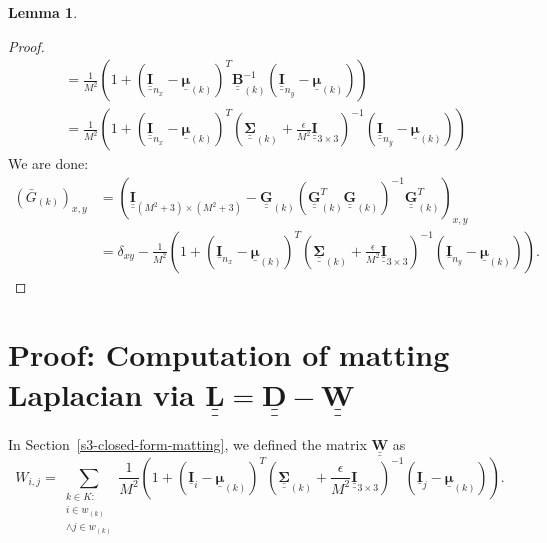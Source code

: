 \documentclass{article}
\theoremstyle{definition}
\newtheorem{lemma}[theorem]{Lemma}
\def\vt#1{\underline{\mathbf{#1}}}
\def\vts#1{\underline{\boldsymbol{#1}}}
\def\mt#1{\underline{\underline{\mathbf{#1}}}}
\def\mts#1{\underline{\underline{\boldsymbol{#1}}}}
\begin{document}
\begin{lemma}
\begin{proof}
\begin{align*}
            &= \frac1{M^2} \left(1 + \left(\mt I_{n_x} - \vts \mu_{(k)}\right)^T \mt B_{(k)}^{-1} \left(\mt I_{n_y} - \vts \mu_{(k)}\right)\right)\\
            &= \frac1{M^2} \left(1 + \left(\mt I_{n_x} - \vts \mu_{(k)}\right)^T \left(\mts \Sigma_{(k)}+\frac\epsilon{M^2}\mt I_{3\times 3}\right)^{-1} \left(\mt I_{n_y} - \vts \mu_{(k)}\right)\right)
        \end{align*}
        We are done:
        \begin{align*}
            \left({\bar{G}}_{(k)}\right)_{x,y} &= \left(\mt I_{(M^2+3)\times(M^2+3)} - \mt G_{(k)} \left(\mt G_{(k)}^T \mt G_{(k)}\right)^{-1} \mt G_{(k)}^T\right)_{x,y} \\
            &= \delta_{xy} - \frac1{M^2}\left(1 + \left(\vt{I}_{n_x} - \vts \mu_{(k)}\right)^T \left(\mts \Sigma_{(k)} + \frac\epsilon{M^2} \mt{I}_{3\times 3}\right)^{-1} \left(\vt{I}_{n_y} - \vts \mu_{(k)}\right) \right).
        \end{align*}
    \end{proof}
\end{lemma}



\newpage
\section{Proof: Computation of matting Laplacian via $\mt L = \mt D - \mt W$} \label{appendix:w-sum-zero-proof}
In Section~\ref{s3-closed-form-matting}, we defined the matrix $\mt W$ as
$$ W_{i,j} = \sum_{\substack{k\in K:\\i\in w_{(k)}\\\wedge j\in w_{(k)}}} \frac1{M^2}\left(1 + \left(\vt{I}_i - \vts \mu_{(k)}\right)^T \left(\mts \Sigma_{(k)} + \frac\epsilon{M^2} \mt{I}_{3\times 3}\right)^{-1} \left(\vt{I}_j - \vts \mu_{(k)}\right) \right). $$
\end{document}
